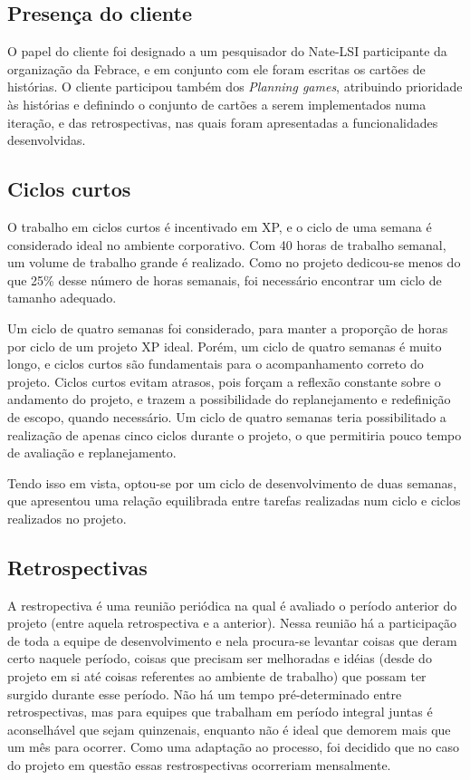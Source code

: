   \subsection{Presença do cliente}
    O papel do cliente foi designado a um pesquisador do Nate-LSI participante da organização da Febrace, e em conjunto com ele foram escritas os cartões de histórias. O cliente participou também dos \textit{Planning games}, atribuindo prioridade às histórias e definindo o conjunto de cartões a serem implementados numa iteração, e das retrospectivas, nas quais foram apresentadas a funcionalidades desenvolvidas.

  \subsection{Ciclos curtos}
    O trabalho em ciclos curtos é incentivado em XP, e o ciclo de uma semana é considerado ideal no ambiente corporativo. Com 40 horas de trabalho semanal, um volume de trabalho grande é realizado. Como no projeto dedicou-se menos do que 25\% desse número de horas semanais, foi necessário encontrar um ciclo de tamanho adequado.

    Um ciclo de quatro semanas foi considerado, para manter a proporção de horas por ciclo de um projeto XP ideal. Porém, um ciclo de quatro semanas é muito longo, e ciclos curtos são fundamentais para o acompanhamento correto do projeto. Ciclos curtos evitam atrasos, pois forçam a reflexão constante sobre o andamento do projeto, e trazem a possibilidade do replanejamento e redefinição de escopo, quando necessário. Um ciclo de quatro semanas teria possibilitado a realização de apenas cinco ciclos durante o projeto, o que permitiria pouco tempo de avaliação e replanejamento.

  Tendo isso em vista, optou-se por um ciclo de desenvolvimento de duas semanas, que apresentou uma relação equilibrada entre tarefas realizadas num ciclo e ciclos realizados no projeto.

  \subsection{Retrospectivas}
    A restropectiva é uma reunião periódica na qual é avaliado o período anterior do projeto (entre aquela retrospectiva e a anterior). Nessa reunião há a participação de toda a equipe de desenvolvimento e nela procura-se levantar coisas que deram certo naquele período, coisas que precisam ser melhoradas e idéias (desde do projeto em si até coisas referentes ao ambiente de trabalho) que possam ter surgido durante esse período. Não há um tempo pré-determinado entre retrospectivas, mas para equipes que trabalham em período integral juntas é aconselhável que sejam quinzenais, enquanto não é ideal que demorem mais que um mês para ocorrer. Como uma adaptação ao processo, foi decidido que no caso do projeto em questão essas restrospectivas ocorreriam mensalmente.

